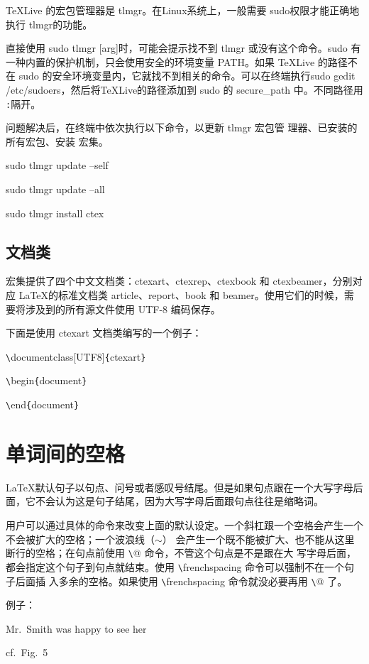 \documentclass[UTF8]{ctexart}
\begin{document}
   \TeX Live 的宏包管理器是 tlmgr。在Linux系统上，一般需要 sudo权限才能正确地执行
   tlmgr的功能。

直接使用 sudo tlmgr [arg]时，可能会提示找不到 tlmgr 或没有这个命令。sudo 有一种内置的保护机制，只会使用安全的环境变量 PATH。如果 \TeX Live 的路径不在
sudo 的安全环境变量内，它就找不到相关的命令。可以在终端执行sudo gedit /etc/sudoers，然后将\TeX Live的路径添加到 sudo 的
secure\_path 中。不同路径用 \texttt{:}隔开。

问题解决后，在终端中依次执行以下命令，以更新 tlmgr 宏包管
理器、已安装的所有宏包、安装 \CTeX 宏集。

    sudo tlmgr update --self

    sudo tlmgr update --all

    sudo tlmgr install ctex
\subsection{\CTeX 文档类}
\CTeX 宏集提供了四个中文文档类：ctexart、ctexrep、ctexbook 和
ctexbeamer，分别对应 \LaTeX 的标准文档类 article、report、book 和
beamer。使用它们的时候，需要将涉及到的所有源文件使用 UTF-8 编码保存。

下面是使用 ctexart 文档类编写的一个例子：

    \texttt{\textbackslash}documentclass[UTF8]\texttt{\{}ctexart\texttt{\}}

    \texttt{\textbackslash}begin\texttt{\{}document\texttt{\}}

    \texttt{\textbackslash}end\texttt{\{}document\texttt{\}}
\section{单词间的空格}
\LaTeX 默认句子以句点、问号或者感叹号结尾。但是如果句点跟在一个大写字母后面，它不会认为这是句子结尾，因为大写字母后面跟句点往往是缩略词。

用户可以通过具体的命令来改变上面的默认设定。一个斜杠跟一个空格会产生一个不会被扩大的空格；一个波浪线（\texttt{$\sim$}）
会产生一个既不能被扩大、也不能从这里断行的空格；在句点前使用 \texttt{\textbackslash}@ 命令，不管这个句点是不是跟在大
写字母后面，都会指定这个句子到句点就结束。使用 \texttt{\textbackslash}frenchspacing 命令可以强制不在一个句子后面插
入多余的空格。如果使用 \texttt{\textbackslash}frenchspacing 命令就没必要再用 \texttt{\textbackslash}@ 了。

例子：

Mr.~Smith was happy to see her

cf.~Fig.~5
\end{document}
